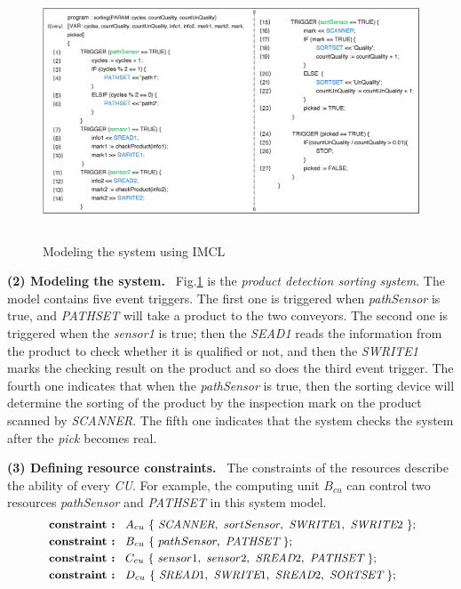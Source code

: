 \begin{figure}[!htb]
    \centering
        \includegraphics[height=3.0in, width=5.5in]{fig_IMCL_code}
    \caption{Modeling the system using IMCL}\label{fig_IMCL_code}
\end{figure}

\textbf{(2) Modeling the system.} \ Fig.\ref{fig_IMCL_code} is the \emph{product detection sorting system}. The model contains five event triggers. The first one is triggered when \emph{pathSensor} is true, and \emph{PATHSET} will take a product to the two conveyors. The second one is triggered when the \emph{sensor1} is true; then the \emph{SEAD1} reads the information from the product to check whether it is qualified or not, and then the \emph{SWRITE1} marks the checking result on the product and so does the third event trigger. The fourth one indicates that when the \emph{pathSensor} is true, then the sorting device will determine the sorting of the product by the inspection mark on the product scanned by \emph{SCANNER}. The fifth one indicates that the system checks the system after the \emph{pick} becomes real.



\textbf{(3) Defining resource constraints.} \ The constraints of the resources describe the ability of every \emph{CU}. For example, the computing unit $B_{cu}$ can control two resources \emph{pathSensor} and \emph{PATHSET} in this system model.
\begin{equation*}
\footnotesize
    \begin{aligned}
        \ \textbf{constraint : \ } & \textbf{$A_{cu}$} \ \{ \ \emph{SCANNER}, \ sortSensor, \ \emph{SWRITE}1, \ \emph{SWRITE}2 \ \};\\
        \ \textbf{constraint : \ } & \textbf{$B_{cu}$} \ \{ \ pathSensor, \ \emph{PATHSET} \ \};\\
        \ \textbf{constraint : \ } & \textbf{$C_{cu}$} \ \{ \ sensor1, \ sensor2, \ \emph{SREAD}2, \ \emph{PATHSET} \ \};\\
        \ \textbf{constraint : \ } & \textbf{$D_{cu}$} \ \{ \ \emph{SREAD}1, \ \emph{SWRITE}1, \ \emph{SREAD}2, \ \emph{SORTSET} \ \};
    \end{aligned}
\end{equation*}


